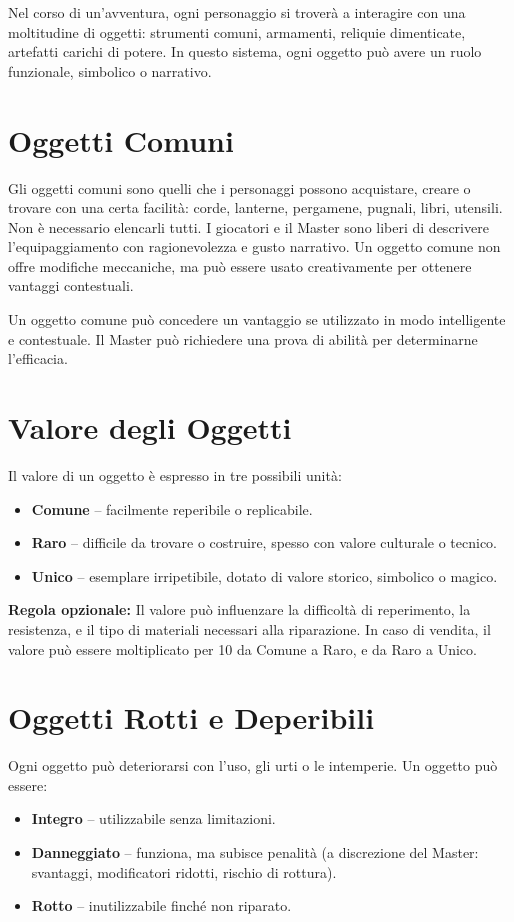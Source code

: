 \documentclass[../manuale_main.tex]{subfiles}
\begin{document}
Nel corso di un’avventura, ogni personaggio si troverà a interagire con una moltitudine di oggetti: strumenti comuni, armamenti, reliquie dimenticate, artefatti carichi di potere. In questo sistema, ogni oggetto può avere un ruolo funzionale, simbolico o narrativo.

\section{Oggetti Comuni}

Gli oggetti comuni sono quelli che i personaggi possono acquistare, creare o trovare con una certa facilità: corde, lanterne, pergamene, pugnali, libri, utensili. Non è necessario elencarli tutti. I giocatori e il Master sono liberi di descrivere l'equipaggiamento con ragionevolezza e gusto narrativo. Un oggetto comune non offre modifiche meccaniche, ma può essere usato creativamente per ottenere vantaggi contestuali.

Un oggetto comune può concedere un vantaggio se utilizzato in modo intelligente e contestuale. Il Master può richiedere una prova di abilità per determinarne l’efficacia.

\section{Valore degli Oggetti}

Il valore di un oggetto è espresso in tre possibili unità:
\begin{itemize}
  \item \textbf{Comune} – facilmente reperibile o replicabile.
  \item \textbf{Raro} – difficile da trovare o costruire, spesso con valore culturale o tecnico.
  \item \textbf{Unico} – esemplare irripetibile, dotato di valore storico, simbolico o magico.
\end{itemize}

\textbf{Regola opzionale:} Il valore può influenzare la difficoltà di reperimento, la resistenza, e il tipo di materiali necessari alla riparazione. In caso di vendita, il valore può essere moltiplicato per 10 da Comune a Raro, e da Raro a Unico.

\section{Oggetti Rotti e Deperibili}

Ogni oggetto può deteriorarsi con l’uso, gli urti o le intemperie. Un oggetto può essere:
\begin{itemize}
  \item \textbf{Integro} – utilizzabile senza limitazioni.
  \item \textbf{Danneggiato} – funziona, ma subisce penalità (a discrezione del Master: svantaggi, modificatori ridotti, rischio di rottura).
  \item \textbf{Rotto} – inutilizzabile finché non riparato.
\end{itemize}
\end{document}
